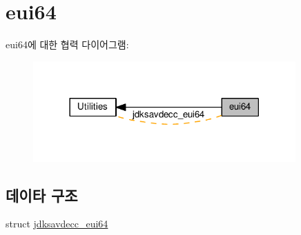 \hypertarget{group__eui64}{}\section{eui64}
\label{group__eui64}
eui64에 대한 협력 다이어그램\+:
\nopagebreak
\begin{figure}[H]
\begin{center}
\leavevmode
\includegraphics[width=285pt]{group__eui64}
\end{center}
\end{figure}
\subsection*{데이타 구조}
\begin{DoxyCompactItemize}
\item 
struct \hyperlink{structjdksavdecc__eui64}{jdksavdecc\+\_\+eui64}
\end{DoxyCompactItemize}
